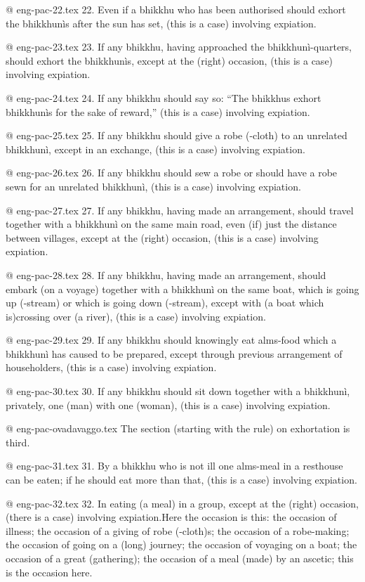 @ eng-pac-22.tex
22. Even if a bhikkhu who has been authorised should exhort the bhikkhunìs after the sun has set, (this is a case) involving expiation.

@ eng-pac-23.tex
23. If any bhikkhu, having approached the bhikkhunì-quarters, should exhort the bhikkhunìs, except at the (right) occasion, (this is a case) involving expiation.

@ eng-pac-24.tex
24. If any bhikkhu should say so: “The bhikkhus exhort bhikkhunìs for the sake of reward,” (this is a case) involving expiation.

@ eng-pac-25.tex
25. If any bhikkhu should give a robe (-cloth) to an unrelated bhikkhunì, except in an exchange, (this is a case) involving expiation.

@ eng-pac-26.tex
26. If any bhikkhu should sew a robe or should have a robe sewn for an unrelated bhikkhunì, (this is a case) involving expiation.

@ eng-pac-27.tex
27. If any bhikkhu, having made an arrangement, should travel together with a bhikkhunì on the same main road, even (if) just the distance between villages, except at the (right) occasion, (this is a case) involving expiation.

@ eng-pac-28.tex
28. If any bhikkhu, having made an arrangement, should embark (on a voyage) together with a bhikkhunì on the same boat, which is going up (-stream) or which is going down (-stream), except with (a boat which is)crossing over (a river), (this is a case) involving expiation.

@ eng-pac-29.tex
29. If any bhikkhu should knowingly eat alms-food which a bhikkhunì has caused to be prepared, except through previous arrangement of householders, (this is a case) involving expiation.

@ eng-pac-30.tex
30. If any bhikkhu should sit down together with a bhikkhunì, privately, one (man) with one (woman), (this is a case) involving expiation.

@ eng-pac-ovadavaggo.tex
The section (starting with the rule) on exhortation is third.

@ eng-pac-31.tex
31. By a bhikkhu who is not ill one alms-meal in a resthouse can be eaten; if he should eat more than that, (this is a case) involving expiation.

@ eng-pac-32.tex
32. In eating (a meal) in a group, except at the (right) occasion, (there is a case) involving expiation.Here the occasion is this: the occasion of illness; the occasion of a giving of robe (-cloth)s; the occasion of a robe-making; the occasion of going on a (long) journey; the occasion of voyaging on a boat; the occasion of a great (gathering); the occasion of a meal (made) by an ascetic; this is the occasion here.

